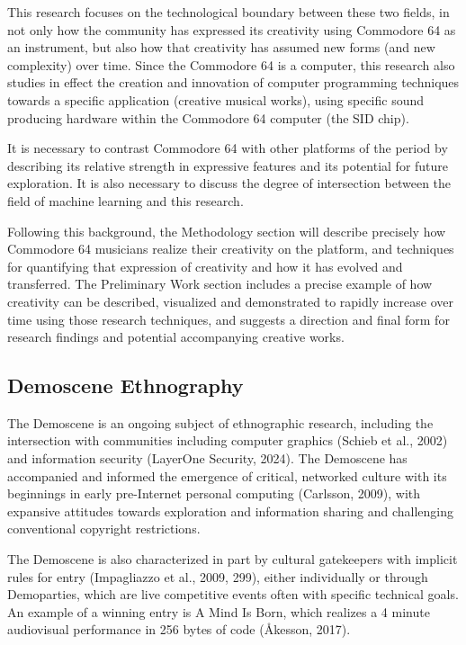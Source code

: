 \documentclass[10pt]{article}
\begin{document}
\begin{multicols*}{2}
This research focuses on the technological boundary between these two fields, in not only how the community has expressed its creativity using Commodore 64 as an instrument, but also how that creativity has assumed new forms (and new complexity) over time. Since the Commodore 64 is a computer, this research also studies in effect the creation and innovation of computer programming techniques towards a specific application (creative musical works), using specific sound producing hardware within the Commodore 64 computer (the SID chip).

It is necessary to contrast Commodore 64 with other platforms of the period by describing its relative strength in expressive features and its potential for future exploration. It is also necessary to discuss the degree of intersection between the field of machine learning and this research.

Following this background, the Methodology section will describe precisely how Commodore 64 musicians realize their creativity on the platform, and techniques for quantifying that expression of creativity and how it has evolved and transferred. The Preliminary Work section includes a precise example of how creativity can be described, visualized and demonstrated to rapidly increase over time using those research techniques, and suggests a direction and final form for research findings and potential accompanying creative works.

\subsection{Demoscene Ethnography}

The Demoscene is an ongoing subject of ethnographic research, including the intersection with communities including computer graphics (Schieb et al., 2002) and information security (LayerOne Security, 2024). The Demoscene has accompanied and informed the emergence of critical, networked culture with its beginnings in early pre-Internet personal computing (Carlsson, 2009), with expansive attitudes towards exploration and information sharing and challenging conventional copyright restrictions.

The Demoscene is also characterized in part by cultural gatekeepers with implicit rules for entry (Impagliazzo et al., 2009, 299), either individually or through Demoparties, which are live competitive events often with specific technical goals. An example of a winning entry is A Mind Is Born, which realizes a 4 minute audiovisual performance in 256 bytes of code (Åkesson, 2017).


\end{multicols*}
\end{document}
